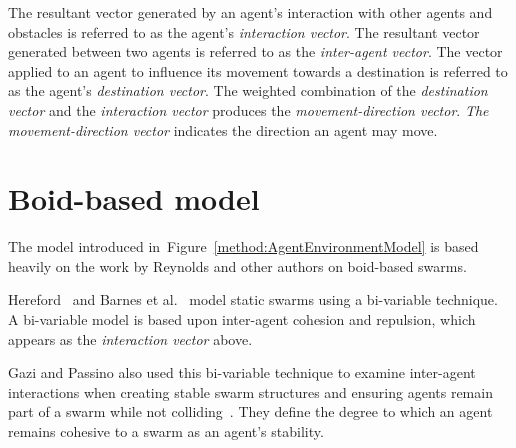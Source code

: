The resultant vector generated by an agent's interaction with other agents and obstacles is referred to as the agent's \textit{interaction vector}. The resultant vector generated between two agents is referred to as the \textit{inter-agent vector}. The vector applied to an agent to influence its movement towards a destination is referred to as the agent's \textit{destination vector}. The weighted combination of the \textit{destination vector} and the \textit{interaction vector} produces the \textit{movement-direction vector}. \textit{The movement-direction vector} indicates the direction an agent may move. 


\section{Boid-based model}\label{methods:BoidModel}
The model introduced in~Figure~\ref{method:AgentEnvironmentModel} is based heavily on the work by Reynolds and other authors on boid-based swarms.

Hereford~\cite{HER:11} and Barnes et al.~\cite{BAF:06} model static swarms using a bi-variable technique. A bi-variable model is based upon inter-agent cohesion and repulsion, which appears as the \textit{interaction vector} above. 

Gazi and Passino also used this bi-variable technique to examine inter-agent interactions when creating stable swarm structures and ensuring agents remain part of a swarm while not colliding~\cite{GP:04a, GP:02, GP:04}. They define the degree to which an agent remains cohesive to a swarm as an agent's stability. 

